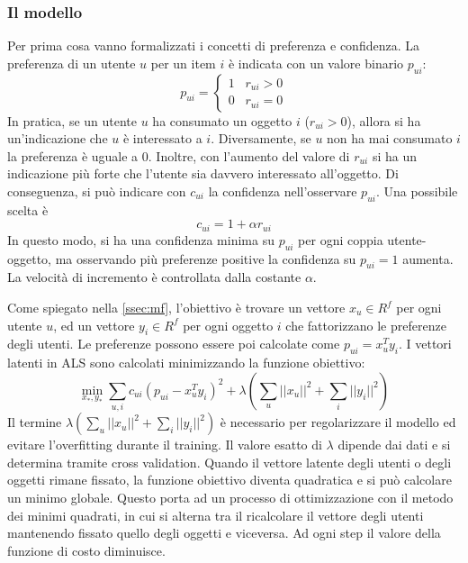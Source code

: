 \documentclass[12pt,italian]{report}
\begin{document}
\subsubsection{Il modello}
Per prima cosa vanno formalizzati i concetti di preferenza e confidenza. La preferenza di un utente $u$ per un item $i$ è indicata con un valore binario $p_{ui}$:
$$
p_{ui} =     \begin{cases}
				1 \;\;\; r_{ui} > 0 \\
				0 \;\;\; r_{ui} = 0
              \end{cases}
$$
In pratica, se un utente $u$ ha consumato un oggetto $i$ ($r_{ui} > 0$), allora si ha un'indicazione che $u$ è interessato a $i$. Diversamente, se $u$ non ha mai consumato $i$ la preferenza è uguale a 0. Inoltre, con l'aumento del valore di $r_{ui}$ si ha un indicazione più forte che l'utente sia davvero interessato all'oggetto. Di conseguenza, si può indicare con $c_{ui}$ la confidenza nell'osservare $p_{ui}$. Una possibile scelta è
$$
c_{ui} = 1 + \alpha r_{ui}
$$
In questo modo, si ha una confidenza minima su $p_{ui}$ per ogni coppia utente-oggetto, ma osservando più preferenze positive la confidenza su $p_{ui} = 1$ aumenta. La velocità di incremento è controllata dalla costante $\alpha$.

Come spiegato nella \autoref{ssec:mf}, l'obiettivo è trovare un vettore $x_u \in R^f$ per ogni utente $u$, ed un vettore $y_i \in R^f$ per ogni oggetto $i$ che fattorizzano le preferenze degli utenti. Le preferenze possono essere poi calcolate come $p_{ui} = x_u^Ty_i$. I vettori latenti in ALS sono calcolati minimizzando la funzione obiettivo:	
$$
\min_{x_*,y_*} \sum_{u,i} c_{ui} (p_{ui} - x_u^Ty_i)^2 + 
\lambda \left( \sum_u ||x_u||^2 + \sum_i ||y_i||^2 \right)
$$
Il termine $\lambda \left( \sum_u ||x_u||^2 + \sum_i ||y_i||^2 \right)$ è necessario per regolarizzare il modello ed evitare l'overfitting durante il training. Il valore esatto di $\lambda$ dipende dai dati e si determina tramite cross validation. 
Quando il vettore latente degli utenti o degli oggetti rimane fissato, la funzione obiettivo diventa quadratica e si può calcolare un minimo globale. Questo porta ad un processo di ottimizzazione con il metodo dei minimi quadrati, in cui si alterna tra il ricalcolare il vettore degli utenti mantenendo fissato quello degli oggetti e viceversa. Ad ogni step il valore della funzione di costo diminuisce.
\end{document}
